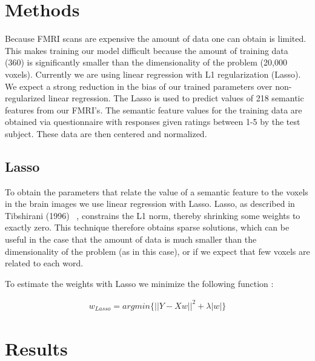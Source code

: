 \documentclass{article} %
\begin{document}
\section{Methods}
Because FMRI scans are expensive the amount of data one can obtain is limited. This makes training our model difficult because the amount of training data (360) is significantly smaller than the dimensionality of the problem (20,000 voxels). Currently we are using linear regression with L1 regularization (Lasso). We expect a strong reduction in the bias of our trained parameters over non-regularized linear regression. The Lasso is used to predict values of 218 semantic features from our FMRI's. The semantic feature values for the training data are obtained via questionnaire with responses given ratings between 1-5 by the test subject. These data are then centered and normalized.



\subsection{Lasso}

To obtain the parameters that relate the value of a semantic feature to the voxels in the brain images we use linear regression with Lasso. Lasso, as described in Tibshirani (1996) ~\cite{lasso}, constrains the L1 norm, thereby shrinking some weights to exactly zero. This technique therefore obtains sparse solutions, which can be useful in the case that the amount of data is much smaller than the dimensionality of the problem (as in this case), or if we expect that few voxels are related to each word. 

To estimate the weights with Lasso we minimize the following function :

\begin{align*}
w_{Lasso} = argmin \{|| Y - Xw ||^2 + \lambda|w|\}
\end{align*}



\section{Results}
\end{document}
